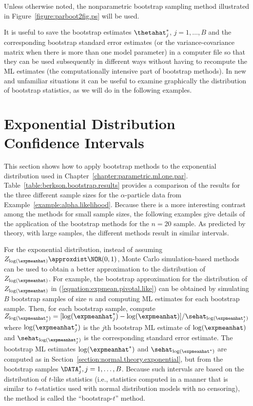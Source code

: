 Unless otherwise noted, the nonparametric bootstrap sampling method
illustrated in Figure~\ref{figure:parboot2fig.ps} will be used.

It is useful to save the bootstrap estimates $\thetahat^{*}_{j}$,
$j=1,\ldots , B$ and the corresponding bootstrap standard error
estimates (or the variance-covariance matrix when there is more than
one model parameter) in a computer file so that they can be used
subsequently in different ways without having to recompute the ML
estimates (the computationally intensive part of bootstrap
methods). In new and unfamiliar situations it can be useful to
examine graphically the distribution of bootstrap statistics, as we
will do in the following examples.


\section{Exponential Distribution Confidence Intervals}
\label{section:exponential.bootstrap}

This section shows how to apply bootstrap methods to the exponential
distribution used in Chapter~\ref{chapter:parametric.ml.one.par}.
Table~\ref{table:berkson.bootstrap.results} provides a comparison of
the results for the three different sample sizes for the
$\alpha$-particle data from
Example~\ref{example:alpha.likelihood}. Because there is a more
interesting contrast among the methods for small sample sizes, the
following examples give details of the application of the bootstrap
methods for the $n=20$ sample. As predicted by theory, with large
samples, the different methods result in similar intervals.

For the exponential distribution,
instead of assuming $Z_{\log(\expmeanhat)}
\approxdist \NOR(0,1)$, Monte Carlo simulation-based 
methods can be used to obtain a better approximation to the
distribution of $Z_{\log(\expmeanhat)}$.
For example, the bootstrap approximation for the distribution of
$Z_{\log(\expmeanhat)}$ in (\ref{equation:expmean.pivotal.like}) can be
obtained by simulating $B$ bootstrap samples of size $n$ and
computing ML estimates for each bootstrap sample. Then, for each
bootstrap sample, compute
$Z_{\log(\expmeanhat^{*}_{j})}=[\log(\expmeanhat^{*}_{j}) -
\log(\expmeanhat)]/\sehat_{\log(\expmeanhat^{*}_{j})}$ where
$\log(\expmeanhat^{*}_{j})$ is the $j$th bootstrap ML estimate of
$\log(\expmeanhat)$ and $\sehat_{\log(\expmeanhat^{*}_{j})}$ is the
corresponding standard error estimate. The bootstrap ML estimates
$\log(\expmeanhat^{*})$ and
$\sehat_{\log(\expmeanhat^{*})}$ are computed as in
Section~\ref{section:normal.theory.exponential}, but from the
bootstrap samples $\DATA^{*}_{j}, j=1, \ldots ,B$. Because such
intervals are based on the distribution of $t$-like statistics
(i.e., statistics computed in a manner that is similar to
$t$-statistics
used with normal distribution models with no censoring),
the method is called the ``bootstrap-$t$'' method.



